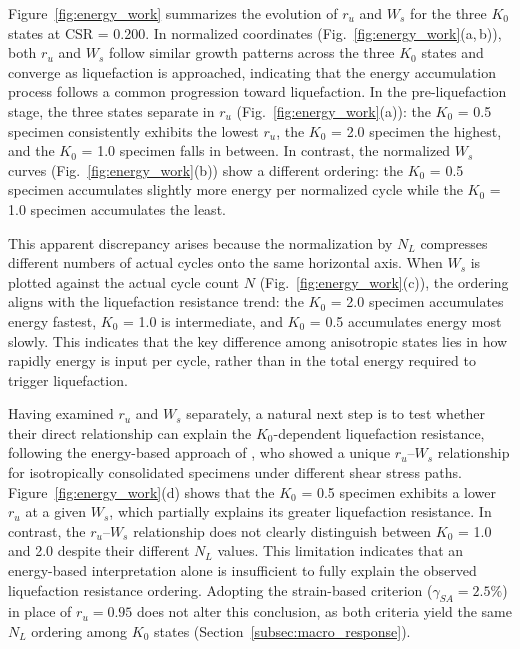 \documentclass[a4paper,fleqn]{cas-sc}
\newcommand{\Kzero}{\ensuremath{K_0}}
\newcommand{\ru}{\ensuremath{r_u}}
\begin{document}
Figure~\ref{fig:energy_work} summarizes the evolution of $\ru$ and $W_s$ for the three \Kzero{} states at CSR = 0.200. In normalized coordinates (Fig.~\ref{fig:energy_work}(a,\,b)), both $\ru$ and $W_s$ follow similar growth patterns across the three \Kzero{} states and converge as liquefaction is approached, indicating that the energy accumulation process follows a common progression toward liquefaction. In the pre-liquefaction stage, the three states separate in $\ru$ (Fig.~\ref{fig:energy_work}(a)): the \Kzero{} = 0.5 specimen consistently exhibits the lowest $\ru$, the \Kzero{} = 2.0 specimen the highest, and the \Kzero{} = 1.0 specimen falls in between. In contrast, the normalized $W_s$ curves (Fig.~\ref{fig:energy_work}(b)) show a different ordering: the \Kzero{} = 0.5 specimen accumulates slightly more energy per normalized cycle while the \Kzero{} = 1.0 specimen accumulates the least.

This apparent discrepancy arises because the normalization by $N_L$ compresses different numbers of actual cycles onto the same horizontal axis. When $W_s$ is plotted against the actual cycle count $N$ (Fig.~\ref{fig:energy_work}(c)), the ordering aligns with the liquefaction resistance trend: the \Kzero{} = 2.0 specimen accumulates energy fastest, \Kzero{} = 1.0 is intermediate, and \Kzero{} = 0.5 accumulates energy most slowly. This indicates that the key difference among anisotropic states lies in how rapidly energy is input per cycle, rather than in the total energy required to trigger liquefaction.

Having examined $\ru$ and $W_s$ separately, a natural next step is to test whether their direct relationship can explain the \Kzero{}-dependent liquefaction resistance, following the energy-based approach of \citet{TowhataIshihara1985}, who showed a unique $\ru$--$W_s$ relationship for isotropically consolidated specimens under different shear stress paths. Figure~\ref{fig:energy_work}(d) shows that the \Kzero{} = 0.5 specimen exhibits a lower $\ru$ at a given $W_s$, which partially explains its greater liquefaction resistance. In contrast, the $\ru$--$W_s$ relationship does not clearly distinguish between \Kzero{} = 1.0 and 2.0 despite their different $N_L$ values. This limitation indicates that an energy-based interpretation alone is insufficient to fully explain the observed liquefaction resistance ordering. Adopting the strain-based criterion ($\gamma_{SA}=2.5\%$) in place of $\ru=0.95$ does not alter this conclusion, as both criteria yield the same $N_L$ ordering among \Kzero{} states (Section~\ref{subsec:macro_response}).
\end{document}
